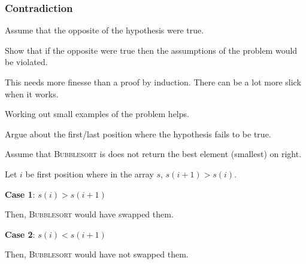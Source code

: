\subsubsection{Contradiction}

\begin{listu}
    \item Assume that the opposite of the hypothesis were true. 
    \item Show that if the opposite were true then the assumptions of the problem would be violated. 
\end{listu}

This needs more finesse than a proof by induction. There can be a lot more slick when it works. 

\begin{listu}
    \item Working out small examples of the problem helps. 
    \item Argue about the first/last position where the hypothesis fails to be true. 
\end{listu}

\begin{example}
    Assume that \textsc{Bubblesort} is does not return the best element (smallest) on right. 

    Let $i$ be first position where in the array $s$, $s(i + 1) > s(i)$.

    \begin{listo}
        \item \textbf{Case 1}: $s(i) > s(i+1)$
        
        Then, \textsc{Bubblesort} would have swapped them. 

        \item \textbf{Case 2}: $s(i) < s(i+1)$
        
        Then, \textsc{Bubblesort} would have not swapped them.
    \end{listo}
\end{example}